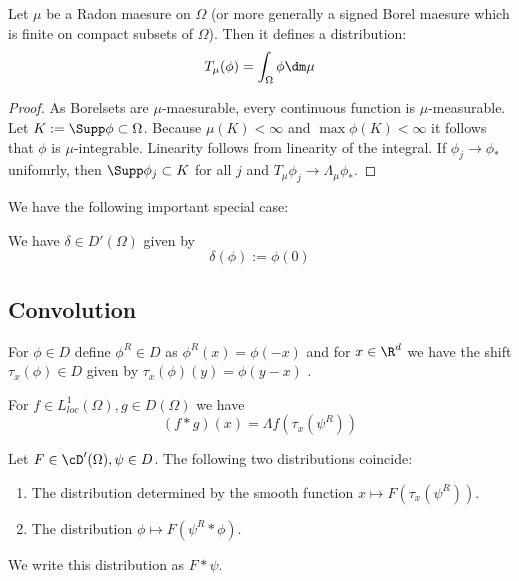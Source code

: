 	\begin{example}
		Let $\mu$ be a Radon maesure on $\Omega$ (or more generally a signed Borel maesure which is finite on compact subsets of $\Omega$). Then it defines a distribution:
		\[
		T_\mu(\phi) = \int_{\Omega} \phi \dm \mu
		\]
	\end{example}
	\begin{proof}
		As Borelsets are $\mu$-maesurable, every continuous function is $\mu$-measurable. Let $K := \Supp \phi \subset \Omega $. Because $\mu(K) < \infty$ and $\max \phi(K) < \infty$ it follows that $\phi$ is $\mu$-integrable. Linearity follows from linearity of the integral. If $\phi_j \to \phi_*$ unifomrly, then $\Supp \phi_j  \subset K$ for all $j$ and $T_\mu \phi_j \to \Lambda_\mu \phi_*$.  
	\end{proof}
	We have the following important special case:
	\begin{example}
		We have $\delta \in D'(\Omega)$ given by
		\[
		\delta(\phi) := \phi(0)
		\]
	\end{example}
	
	\subsection{Convolution}
	\begin{notation}
		For $\phi \in D$ define $\phi^R \in D$ as $\phi^R(x) = \phi(-x)$ and for $x \in \R^d$ we have the shift $\tau_x(\phi) \in D$ given by $\tau_x(\phi)(y) = \phi(y - x)$ .
	\end{notation}
	\begin{example}{\label{ex:conv}}
		For $f \in L^1_{loc}(\Omega), g \in D(\Omega)$ we have 
		\[
		(f * g)(x) = \Lambda f (\tau_x (\psi^R))
		\]
	\end{example}
	\begin{proposition}
		
		Let $F \in \cD'(\Omega) , \psi \in D$. The following two distributions coincide:
		\begin{enumerate}
			\item The distribution determined by the smooth function $x \mapsto F(\tau_x (\psi^R))$. 
			\item The distribution $\phi \mapsto F(\psi^R * \phi)$.
		\end{enumerate}
		We write this distribution as $F * \psi$. 
	\end{proposition}
	
